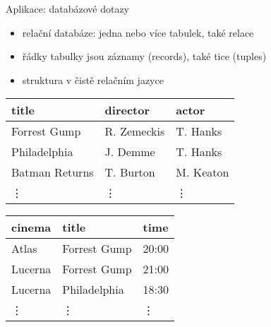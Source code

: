 \documentclass{beamer}
\begin{document}
\begin{frame}{Aplikace: databázové dotazy}
    
    \pause
    \begin{itemize}
        \item \alert{relační databáze}: jedna nebo více \alert{tabulek}, také \alert{relace}\pause
        \item řádky tabulky jsou \alert{záznamy (records)}, také \alert{tice (tuples)}\pause
        \item struktura v čistě relačním jazyce\pause
    \end{itemize}

    \medskip

    {\ttfamily\scriptsize

        \hspace{2cm}{\bf\small Movies}
        
        \hspace{2cm}\begin{tabular}{lll}
            title          & director    & actor \\ \hline
            Forrest Gump   & R. Zemeckis & T. Hanks      \\
            Philadelphia   & J. Demme    & T. Hanks      \\
            Batman Returns & T. Burton   & M. Keaton     \\
            \vdots         & \vdots      & \vdots
        \end{tabular} \pause
 
        \hspace{2cm}{\bf\small Program}

        \hspace{2cm}\begin{tabular}{lll}
            cinema         & title          & time   \\ \hline
            Atlas          & Forrest Gump   & 20:00  \\
            Lucerna        & Forrest Gump   & 21:00  \\
            Lucerna        & Philadelphia   & 18:30  \\
            \vdots         & \vdots         & \vdots
        \end{tabular}

    }

\end{frame}
\end{document}
